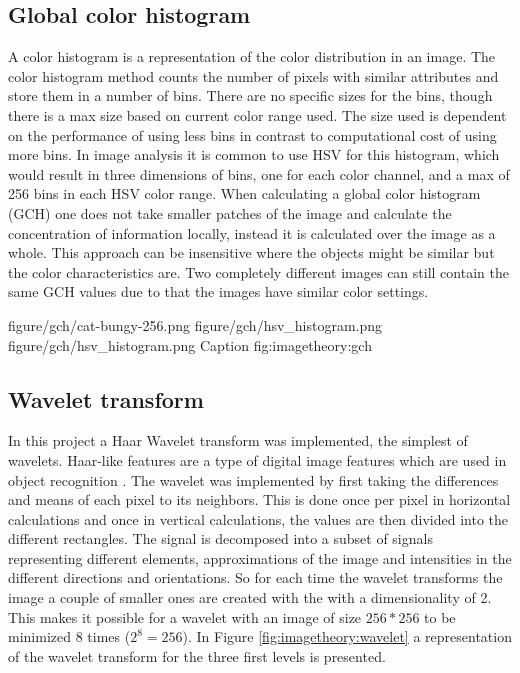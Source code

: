 \subsection{Global color histogram}
\label{sec:gch_feature}

A color histogram is a representation of the color distribution in an image. The color histogram method counts the number of pixels with similar attributes and store them in a number of bins. There are no specific sizes for the bins, though there is a max size based on current color range used. The size used is dependent on the performance of using less bins in contrast to computational cost of using more bins. In image analysis it is common to use HSV for this histogram, which would result in three dimensions of bins, one for each color channel, and a max of 256 bins in each HSV color range. When calculating a global color histogram (GCH) one does not take smaller patches of the image and calculate the concentration of information locally, instead it is calculated over the image as a whole. This approach can be insensitive where the objects might be similar but the color characteristics are. Two completely different images can still contain the same GCH values due to that the images have similar color settings.

\threefigure
{figure/gch/cat-bungy-256.png}
{figure/gch/hsv_histogram.png}
{figure/gch/hsv_histogram.png}
{Caption}
{fig:imagetheory:gch} 

\subsection{Wavelet transform}
\label{sec:wlt_feature}

In this project a Haar Wavelet transform was implemented, the simplest of wavelets. Haar-like features are a type of digital image features which are used in object recognition \cite{pavani2010haar}. The wavelet was implemented by first taking the differences and means of each pixel to its neighbors. This is done once per pixel in horizontal calculations and once in vertical calculations, the values are then divided into the different rectangles. The signal is decomposed into a subset of signals representing different elements, approximations of the image and intensities in the different directions and orientations. So for each time the wavelet transforms the image a couple of smaller ones are created with the with a dimensionality of 2. This makes it possible for a wavelet with an image of size $256*256$ to be minimized 8 times ($2^8 = 256$). In Figure \ref{fig:imagetheory:wavelet} a representation of the wavelet transform for the three first levels is presented.

